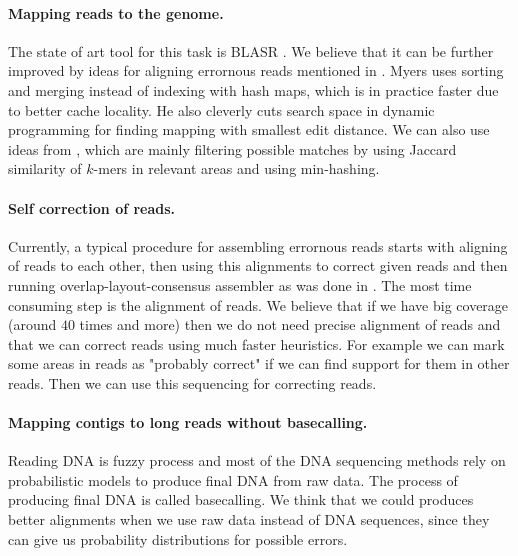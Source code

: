 \paragraph{Mapping reads to the genome.} The state of art tool
for this task is BLASR \citep{BLASR}. We believe
that it can be further improved by ideas for aligning errornous reads
mentioned in \citet{myers2014efficient}. 
Myers uses sorting and merging instead of indexing with hash maps,
which is in practice faster due to better cache locality.
He also cleverly cuts search space in dynamic programming for finding mapping
with smallest edit distance.
We can also use ideas from \cite{MHAP}, which are mainly filtering
possible matches by using Jaccard similarity of $k$-mers in relevant areas
and using min-hashing.

\paragraph{Self correction of reads.}
Currently, a typical procedure for assembling errornous reads
starts with aligning of reads to each other, then using this alignments
to correct given reads and then running overlap-layout-consensus assembler
as was done in \cite{MHAP}.
The most time consuming step is the alignment of reads.
We believe that if we have big coverage (around $40$ times and more) then
we do not need precise alignment of reads and that we can
correct reads using much faster heuristics. For example
we can mark some areas in reads as "probably correct" if we can
find support for them in other reads. Then we can
use this sequencing for correcting reads.

\paragraph{Mapping contigs to long reads without basecalling.}
Reading DNA is fuzzy process and most of the DNA sequencing
methods rely on probabilistic models to produce final DNA
from raw data. The process of producing final DNA is called basecalling.
We think that we could produces better alignments when
we use raw data instead of DNA sequences, since they can give
us probability distributions for possible errors. 

\label{LastPage}

